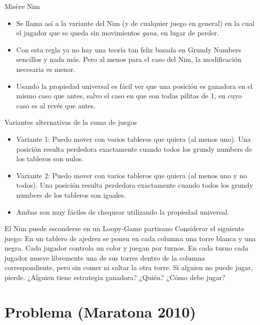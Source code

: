 \documentclass{beamer}
\begin{document}
\begin{frame}{Misère Nim}
    \begin{itemize}
        \item Se llama así a la variante del Nim (y de cualquier juego en general) en la cual el jugador que se queda sin movimientos
        \textit{gana}, en lugar de perder.
        \item Con esta regla ya no hay una teoría tan feliz basada en Grundy Numbers sencillos y nada más. Pero al menos para el
        caso del Nim, la modificación necesaria es menor.
        \item Usando la propiedad universal es fácil ver que una posición es ganadora en el mismo caso que antes, salvo
        el caso en que son todas pilitas de 1, en cuyo caso es al revés que antes.
    \end{itemize}
\end{frame}

\begin{frame}{Variantes alternativas de la suma de juegos}
    \begin{itemize}
        \item Variante 1: Puedo mover con varios tableros que quiera (al menos uno). Una posición resulta perdedora exactamente
         cuando todos los grundy numbers de los tableros son nulos.
        \item Variante 2: Puedo mover con varios tableros que quiera (al menos uno y no todos). Una posición resulta perdedora exactamente
         cuando todos los grundy numbers de los tableros son iguales.
        \item Ambas son muy fáciles de chequear utilizando la propiedad universal.
    \end{itemize}
\end{frame}

\begin{frame}{El Nim puede esconderse en un Loopy-Game partisano }
        Considerar el siguiente juego: En un tablero de ajedrez se ponen en cada columna una torre blanca y una negra. Cada
        jugador controla un color y juegan por turnos. En cada turno cada jugador mueve libremente una de sus torres dentro
        de la columna correspondiente, pero sin comer ni saltar la otra torre. Si alguien no puede jugar, pierde. ¿Alguien
        tiene estrategia ganadora? ¿Quién? ¿Cómo debe jugar?
\end{frame}

\section{Problema (Maratona 2010)}
\end{document}
